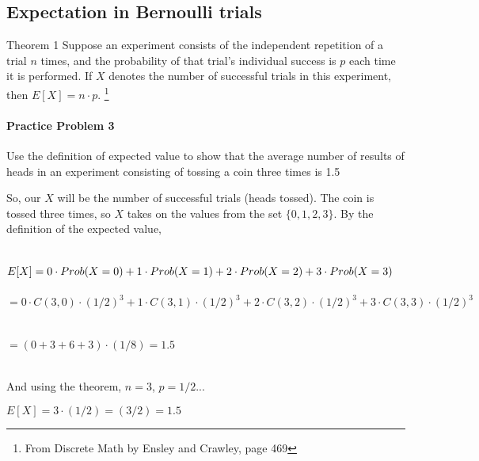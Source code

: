 \documentclass[a4paper,12pt]{book}
\begin{document}
		\newpage

		\subsection{Expectation in Bernoulli trials}

        \begin{intro}{Theorem 1}
	        Suppose an experiment consists of the independent repetition
	        of a trial $n$ times, and the probability of that trial's
	        individual success is $p$ each time it is performed.
	        If $X$ denotes the number of successful trials in this experiment,
	        then $E[X] = n \cdot p$.
            \footnote{From Discrete Math by Ensley and Crawley, page 469}

            \paragraph{Practice Problem 3}
            Use the definition of expected value to show that the average
            number of results of heads in an experiment
            consisting of tossing a coin three times is 1.5

            So, our $X$ will be the number of successful trials (heads tossed).
            The coin is tossed three times, so $X$ takes on the values from
            the set $\{0, 1, 2, 3\}$. By the definition of the expected value,

            ~\\
            $E[X] = \\ 0 \cdot Prob(X = 0) + 1 \cdot Prob(X = 1) + 2 \cdot Prob(X = 2)
            + 3 \cdot Prob(X = 3)$ ~\\~\\
            $= 0 \cdot C(3,0) \cdot (1/2)^{3} + 1 \cdot C(3,1) \cdot (1/2)^{3}
            + 2 \cdot C(3,2) \cdot (1/2)^{3} + 3 \cdot C(3,3) \cdot (1/2)^{3}$ ~\\~\\
            $ = (0 + 3 + 6 + 3) \cdot (1/8) = 1.5$

            ~\\
            And using the theorem, $n = 3$, $p = 1/2$...

            $E[X] = 3 \cdot (1/2) = (3/2) = 1.5$
		\end{intro}
\end{document}
